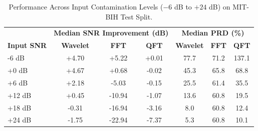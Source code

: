 \begin{table}[t]
\centering
\caption{Performance Across Input Contamination Levels ($-6$ dB to $+24$ dB) on MIT-BIH Test Split.}
\label{tab:snr_levels}
\begin{tabular}{lcccccc}
\hline
 & \multicolumn{3}{c}{\textbf{Median SNR Improvement (dB)}} & \multicolumn{3}{c}{\textbf{Median PRD (\%)}}\\
\textbf{Input SNR} & \textbf{Wavelet} & \textbf{FFT} & \textbf{QFT} & \textbf{Wavelet} & \textbf{FFT} & \textbf{QFT} \\
\hline
-6 dB & +4.70 & +5.22 & +0.01 & 77.7 & 71.2 & 137.1 \\
+0 dB & +4.67 & +0.68 & -0.02 & 45.3 & 65.8 & 68.8 \\
+6 dB & +2.18 & -5.03 & -0.15 & 25.5 & 61.4 & 35.5 \\
+12 dB & +0.45 & -10.94 & -1.07 & 13.6 & 60.8 & 19.5 \\
+18 dB & -0.31 & -16.94 & -3.16 & 8.0 & 60.8 & 12.4 \\
+24 dB & -1.75 & -22.94 & -7.37 & 5.3 & 60.8 & 10.1 \\
\hline
\end{tabular}
\end{table}
